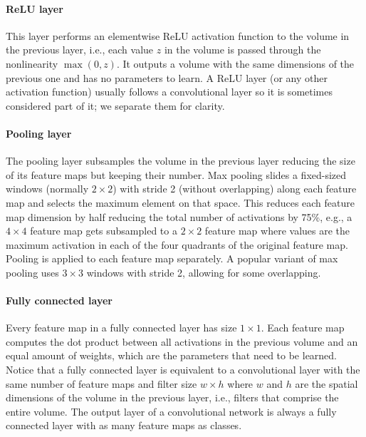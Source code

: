 \paragraph{ReLU layer} This layer performs an elementwise ReLU activation function to the volume in the previous layer, i.e., each value $z$ in the volume is passed through the nonlinearity $\max(0,z)$. It outputs a volume with the same dimensions of the previous one and has no parameters to learn. A ReLU layer (or any other activation function) usually follows a convolutional layer so it is sometimes considered part of it; we separate them for clarity. 

\paragraph{Pooling layer} The pooling layer subsamples the volume in the previous layer reducing the size of its feature maps but keeping their number. Max pooling slides a fixed-sized windows (normally $2\times2$) with stride 2 (without overlapping) along each feature map and selects the maximum element on that space. This reduces each feature map dimension by half reducing the total number of activations by 75\%, e.g., a $4\times4$ feature map gets subsampled to a $2\times 2$ feature map where values are the maximum activation in each of the four quadrants of the original feature map. Pooling is applied to each feature map separately. A popular variant of max pooling uses $3\times 3$ windows with stride 2, allowing for some overlapping.

\paragraph{Fully connected layer} Every feature map in a fully connected layer has size $1 \times 1$. Each feature map computes the dot product between all activations in the previous volume and an equal amount of weights, which are the parameters that need to be learned. Notice that a fully connected layer is equivalent to a convolutional layer with the same number of feature maps and filter size $w\times h$ where $w$ and $h$ are the spatial dimensions of the volume in the previous layer, i.e., filters that comprise the entire volume. The output layer of a convolutional network is always a fully connected layer with as many feature maps as classes. %

